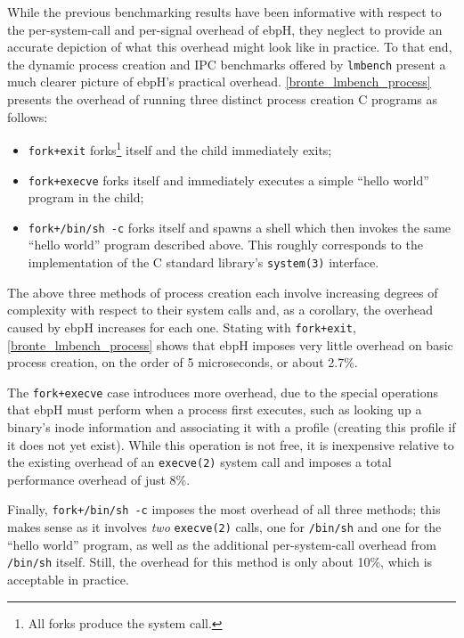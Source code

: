 \documentclass[
  12pt]{findlay}
\newcommand{\passthrough}[1]{#1}
\providecommand{\tightlist}{\setlength{\itemsep}{0pt}\setlength{\parskip}{0pt}}
\begin{document}
\FloatBarrier

While the previous benchmarking results have been informative with
respect to the per-system-call and per-signal overhead of ebpH, they
neglect to provide an accurate depiction of what this overhead might
look like in practice. To that end, the dynamic process creation and IPC
benchmarks offered by \passthrough{\lstinline!lmbench!} present a much
clearer picture of ebpH's practical overhead.
\autoref{bronte_lmbench_process} presents the overhead of running three
distinct process creation C programs as follows:

\begin{itemize}
\tightlist
\item
  \passthrough{\lstinline!fork+exit!}
  forks\footnote{All forks produce the  system call.}
  itself and the child immediately exits;
\item
  \passthrough{\lstinline!fork+execve!} forks itself and immediately
  executes a simple ``hello world'' program in the child;
\item
  \passthrough{\lstinline!fork+/bin/sh -c!} forks itself and spawns a
  shell which then invokes the same ``hello world'' program described
  above. This roughly corresponds to the implementation of the C
  standard library's \passthrough{\lstinline!system(3)!}
  \autocite{man_system} interface.
\end{itemize}

The above three methods of process creation each involve increasing
degrees of complexity with respect to their system calls and, as a
corollary, the overhead caused by ebpH increases for each one. Stating
with \passthrough{\lstinline!fork+exit!},
\autoref{bronte_lmbench_process} shows that ebpH imposes very little
overhead on basic process creation, on the order of 5 microseconds, or
about 2.7\%.

The \passthrough{\lstinline!fork+execve!} case introduces more overhead,
due to the special operations that ebpH must perform when a process
first executes, such as looking up a binary's inode information and
associating it with a profile (creating this profile if it does not yet
exist). While this operation is not free, it is inexpensive relative to
the existing overhead of an \passthrough{\lstinline!execve(2)!} system
call and imposes a total performance overhead of just 8\%.

Finally, \passthrough{\lstinline!fork+/bin/sh -c!} imposes the most
overhead of all three methods; this makes sense as it involves
\emph{two} \passthrough{\lstinline!execve(2)!} calls, one for
\passthrough{\lstinline!/bin/sh!} and one for the ``hello world''
program, as well as the additional per-system-call overhead from
\passthrough{\lstinline!/bin/sh!} itself. Still, the overhead for this
method is only about 10\%, which is acceptable in practice.
\end{document}
